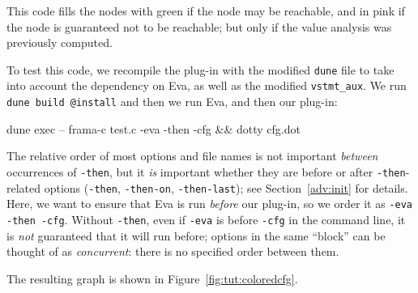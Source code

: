 
This code fills the nodes with green if the node may be
reachable, and in pink if the node is guaranteed not to be
reachable; but only if the value analysis was previously computed.

To test this code, we recompile the plug-in with the modified \texttt{dune}
file to take into account the dependency on \textsf{Eva}, as well as the
modified \texttt{vstmt\_aux}. We run \verb|dune build @install| and then
we run \textsf{Eva}, and then our plug-in:
\begin{frama-c-commands}
  dune exec -- frama-c test.c -eva -then -cfg && dotty cfg.dot
\end{frama-c-commands}

The relative order of most options and file names is not important
{\em between} occurrences of \texttt{-then}, but it {\em is} important
whether they are before or after \texttt{-then}-related options
(\texttt{-then}, \texttt{-then-on}, \texttt{-then-last});
see Section~\ref{adv:init} for details. Here, we want to ensure that
\textsf{Eva} is run {\em before} our plug-in, so we order it as
\verb|-eva -then -cfg|. Without \texttt{-then}, even if \texttt{-eva}
is before \texttt{-cfg} in the command line, it is {\em not} guaranteed
that it will run before; options in the same ``block'' can be thought of as
{\em concurrent}: there is no specified order between them.

The resulting graph is shown in Figure~\ref{fig:tut:coloredcfg}.

